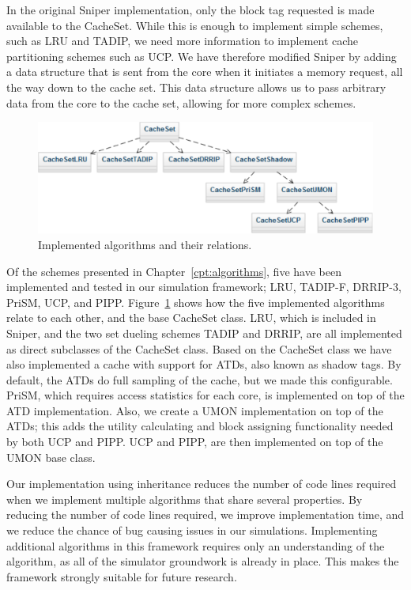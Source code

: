 In the original Sniper implementation, only the block tag requested is made available to the CacheSet. 
While this is enough to implement simple schemes, such as LRU and TADIP, we need more information to implement cache partitioning schemes such as UCP.
We have therefore modified Sniper by adding a data structure that is sent from the core when it initiates a memory request, all the way down to the cache set.
This data structure allows us to pass arbitrary data from the core to the cache set, allowing for more complex schemes.

\begin{figure}[ht]
\centering
\includegraphics[scale=0.7]{figures/framework/algorithms}
\caption{Implemented algorithms and their relations.}
\label{fig:framework:implementation:algorithms}
\end{figure}

Of the schemes presented in Chapter~\ref{cpt:algorithms}, five have been implemented and tested in our simulation framework; LRU, TADIP-F, DRRIP-3, PriSM, UCP, and PIPP.
Figure~\ref{fig:framework:implementation:algorithms} shows how the five implemented algorithms relate to each other, and the base CacheSet class.
LRU, which is included in Sniper, and the two set dueling schemes TADIP and DRRIP, are all implemented as direct subclasses of the CacheSet class.
Based on the CacheSet class we have also implemented a cache with support for ATDs, also known as shadow tags.
By default, the ATDs do full sampling of the cache, but we made this configurable.
PriSM, which requires access statistics for each core, is implemented on top of the ATD implementation.
Also, we create a UMON implementation on top of the ATDs; this adds the utility calculating and block assigning functionality needed by both UCP and PIPP.
UCP and PIPP, are then implemented on top of the UMON base class.

Our implementation using inheritance reduces the number of code lines required when we implement multiple algorithms that share several properties.
By reducing the number of code lines required, we improve implementation time, and we reduce the chance of bug causing issues in our simulations.
Implementing additional algorithms in this framework requires only an understanding of the algorithm, as all of the simulator groundwork is already in place.
This makes the framework strongly suitable for future research.
